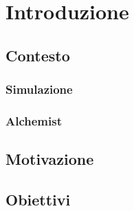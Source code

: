 \chapter{Introduzione}
\label{chap:introduction}

\section{Contesto}
\subsection{Simulazione}
\subsection{Alchemist}
\section{Motivazione}
\section{Obiettivi}
